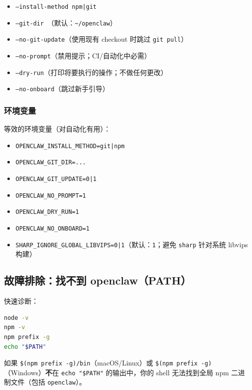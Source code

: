 \begin{itemize}
  \item \texttt{--install-method npm|git}
  \item \texttt{--git-dir }（默认：\texttt{\textasciitilde{}/openclaw}）
  \item \texttt{--no-git-update}（使用现有 checkout 时跳过 \texttt{git pull}）
  \item \texttt{--no-prompt}（禁用提示；CI/自动化中必需）
  \item \texttt{--dry-run}（打印将要执行的操作；不做任何更改）
  \item \texttt{--no-onboard}（跳过新手引导）
\end{itemize}


\subsubsection{环境变量}


等效的环境变量（对自动化有用）：

\begin{itemize}
  \item \texttt{OPENCLAW\_INSTALL\_METHOD=git|npm}
  \item \texttt{OPENCLAW\_GIT\_DIR=...}
  \item \texttt{OPENCLAW\_GIT\_UPDATE=0|1}
  \item \texttt{OPENCLAW\_NO\_PROMPT=1}
  \item \texttt{OPENCLAW\_DRY\_RUN=1}
  \item \texttt{OPENCLAW\_NO\_ONBOARD=1}
  \item \texttt{SHARP\_IGNORE\_GLOBAL\_LIBVIPS=0|1}（默认：\texttt{1}；避免 \texttt{sharp} 针对系统 libvips 构建）
\end{itemize}


\subsection{故障排除：找不到 openclaw（PATH）}


快速诊断：

\begin{lstlisting}[language=bash]
node -v
npm -v
npm prefix -g
echo "$PATH"
\end{lstlisting}


如果 \texttt{\$(npm prefix -g)/bin}（macOS/Linux）或 \texttt{\$(npm prefix -g)}（Windows）\textbf{不}在 \texttt{echo "\$PATH"} 的输出中，你的 shell 无法找到全局 npm 二进制文件（包括 \texttt{openclaw}）。

